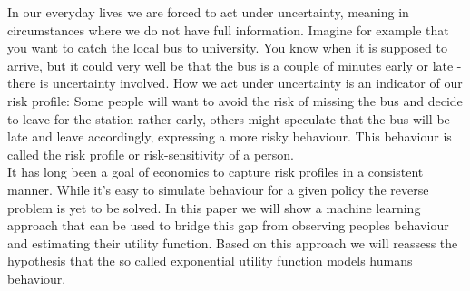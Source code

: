 In our everyday lives we are forced to act under uncertainty, meaning in circumstances where we do not have full information. Imagine for example that you want to catch the local bus to university. You know when it is supposed to arrive, but it could very well be that the bus is a couple of minutes early or late - there is uncertainty involved. How we act under uncertainty is an indicator of our risk profile: Some people will want to avoid the risk of missing the bus and decide to leave for the station rather early, others might speculate that the bus will be late and leave accordingly, expressing a more risky behaviour. This behaviour is called the risk profile or risk-sensitivity of a person.\\
It has long been a goal of economics to capture risk profiles in a consistent manner. While it's easy to simulate behaviour for a given policy the reverse problem is yet to be solved.
In this paper we will show a machine learning approach that can be used to bridge this gap from observing peoples behaviour and estimating their utility function.
Based on this approach we will reassess the hypothesis that the so called exponential utility function models humans behaviour.